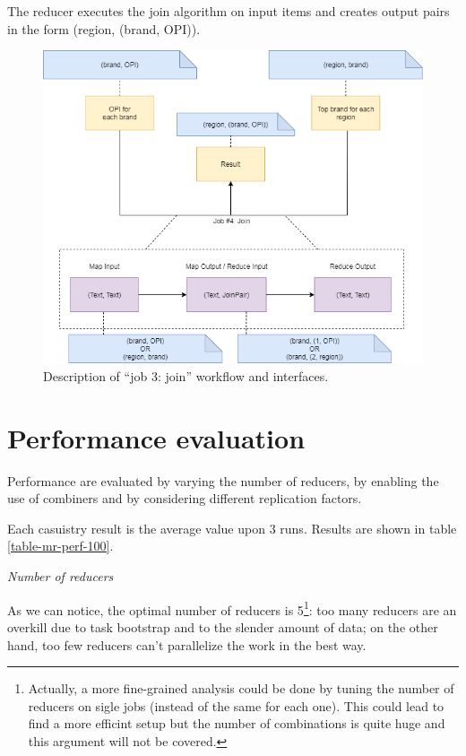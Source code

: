 The reducer executes the join algorithm on input items and creates output pairs in the form (region, (brand, OPI)). 

\begin{figure}[H]
	\centering
	\includegraphics[scale=0.7]{images/2-mapreduce/MR-job-3.png}
	\caption{Description of ``job 3: join'' workflow and interfaces.}
	\label{fig:MR-job-3}
\end{figure}  


\section{Performance evaluation}

Performance are evaluated by varying the number of reducers, by enabling the use of combiners and by considering different replication factors.

Each casuistry result is the average value upon 3 runs. Results are shown in table \ref{table-mr-perf-100}.

\bigskip
\textit{Number of reducers}
\bigskip

As we can notice, the optimal number of reducers is 5\footnote{Actually, a more fine-grained analysis could be done by tuning the number of reducers on sigle jobs (instead of the same for each one). This could lead to find a more efficint setup but the number of combinations is quite huge and this argument will not be covered. }: too many reducers are an overkill due to task bootstrap and to the slender amount of data; on the other hand, too few reducers can't parallelize the work in the best way.

